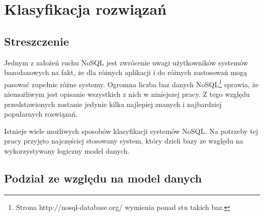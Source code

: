 \chapter{Klasyfikacja rozwiązań}

\section*{Streszczenie}

Jednym z założeń ruchu NoSQL jest zwrócenie uwagi użytkowników systemów bazodanowych na fakt, że dla różnych aplikacji i do różnych zastosowań mogą pasować zupełnie różne systemy.
Ogromna liczba baz danych NoSQL\footnote{Strona http://nosql-database.org/ wymienia ponad stu takich baz.} sprawia, że niemożliwym jest opisanie wszystkich z nich w niniejszej pracy.
Z tego względu przedstawionych zostanie jedynie kilka najlepiej znanych i najbardziej popularnych rozwiązań.

Istnieje wiele możliwych sposobów klasyfikacji systemów NoSQL.
Na potrzeby tej pracy przyjęto najczęściej stosowany system, który dzieli bazy ze względu na wykorzystywany logiczny model danych.

\section{Podział ze względu na model danych}

